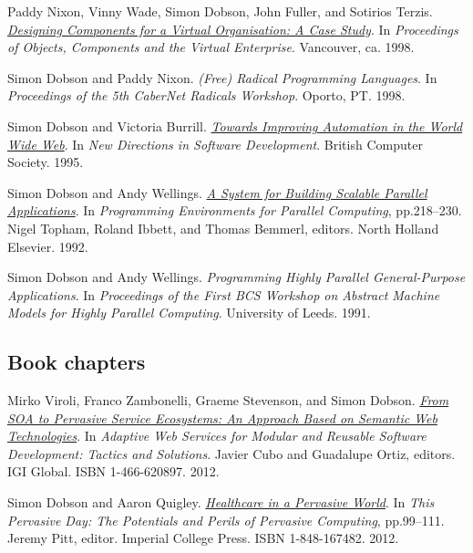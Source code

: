 \documentclass[11pt]{article}
\begin{document}
\label{org35d0086}Paddy Nixon, Vinny Wade, Simon Dobson, John Fuller, and Sotirios Terzis.  \emph{\href{https://simondobson.org/softcopy/virtues-ocve-1998.pdf}{Designing Components for a Virtual Organisation: A Case Study}}. In \emph{Proceedings of Objects, Components and the Virtual Enterprise}. Vancouver, ca. 1998.

\label{org5764b51}Simon Dobson and Paddy Nixon.  \emph{(Free) Radical Programming Languages}. In \emph{Proceedings of the 5th CaberNet Radicals Workshop}. Oporto, PT. 1998.

\label{org161da98}Simon Dobson and Victoria Burrill.  \emph{\href{https://simondobson.org/softcopy/lightweight-databases-bcs-1995.pdf}{Towards Improving Automation in the World Wide Web}}. In \emph{New Directions in Software Development}. British Computer Society. 1995.

\label{org93a3162}Simon Dobson and Andy Wellings.  \emph{\href{https://simondobson.org/softcopy/scalable-parallel-applications-92.pdf}{A System for Building Scalable Parallel Applications}}. In \emph{Programming Environments for Parallel Computing}, pp.218–230. Nigel Topham, Roland Ibbett, and Thomas Bemmerl, editors. North Holland Elsevier. 1992.

\label{orgc7cb6ab}Simon Dobson and Andy Wellings.  \emph{Programming Highly Parallel General-Purpose Applications}. In \emph{Proceedings of the First BCS Workshop on Abstract Machine Models for Highly Parallel Computing}. University of Leeds. 1991.

\subsection{Book chapters}
\label{sec:orge9c5d68}

\label{orge6ad967}Mirko Viroli, Franco Zambonelli, Graeme Stevenson, and Simon Dobson.  \emph{\href{https://simondobson.org/softcopy/sapere-soa-semantic-web-12.pdf}{From SOA to Pervasive Service Ecosystems: An Approach Based on Semantic Web Technologies}}. In \emph{Adaptive Web Services for Modular and Reusable Software Development: Tactics and Solutions}. Javier Cubo and Guadalupe Ortiz, editors. IGI Global. ISBN 1-466-620897. 2012.

\label{org0f7ead3}Simon Dobson and Aaron Quigley.  \emph{\href{http://www.amazon.co.uk/This-Pervasive-Day-Potential-Computing/dp/1848167482}{Healthcare in a Pervasive World}}. In \emph{This Pervasive Day: The Potentials and Perils of Pervasive Computing}, pp.99–111. Jeremy Pitt, editor. Imperial College Press. ISBN 1-848-167482. 2012.
\end{document}
